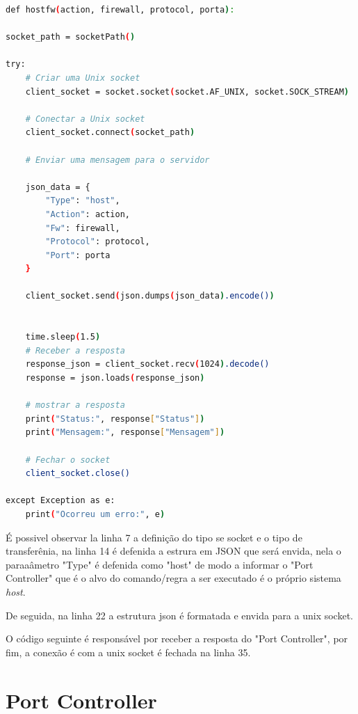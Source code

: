 \begin{lstlisting}[language=Bash, caption={Definição de um caminho}]
def hostfw(action, firewall, protocol, porta):

socket_path = socketPath()

try:
    # Criar uma Unix socket
    client_socket = socket.socket(socket.AF_UNIX, socket.SOCK_STREAM)

    # Conectar a Unix socket
    client_socket.connect(socket_path)

    # Enviar uma mensagem para o servidor
    
    json_data = {
        "Type": "host",
        "Action": action,
        "Fw": firewall,
        "Protocol": protocol,
        "Port": porta
    }
    
    client_socket.send(json.dumps(json_data).encode())


    time.sleep(1.5)
    # Receber a resposta 
    response_json = client_socket.recv(1024).decode()
    response = json.loads(response_json)

    # mostrar a resposta
    print("Status:", response["Status"])
    print("Mensagem:", response["Mensagem"])

    # Fechar o socket
    client_socket.close()

except Exception as e:
    print("Ocorreu um erro:", e)  
\end{lstlisting}


É possivel observar la linha 7 a definição do tipo se socket e o tipo de transferênia,
na linha 14 é defenida a estrura em JSON que será envida, nela o paraaâmetro "Type" é 
defenida como "host" de modo a informar o "Port Controller" que é o alvo do comando/regra a ser
executado é o próprio sistema \textit{host}.

De seguida, na linha 22 a estrutura json é formatada e envida para a unix socket.

O código seguinte é responsável por receber a resposta do "Port Controller", por fim, a conexão
é com a unix socket é fechada na linha 35. 











\section{Port Controller}

